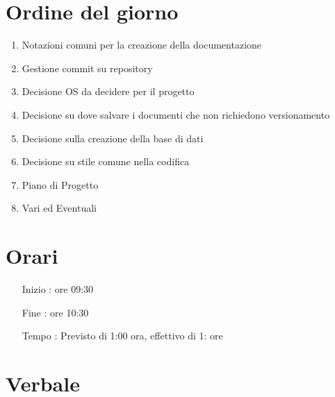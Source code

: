 \documentclass[11pt]{meetingmins}
\begin{document}
\maketitle

\section{Ordine del giorno}

\begin{enumerate}

\item Notazioni comuni per la creazione della documentazione
\item Gestione commit su repository
\item Decisione OS da decidere per il progetto
\item Decisione su dove salvare i documenti che non richiedono versionamento
\item Decisione sulla creazione della base di dati
\item Decisione su stile comune nella codifica
\item Piano di Progetto
  \item Vari ed Eventuali

\end{enumerate}

\section{Orari}

\begin{itemize}
\item[Inizio]: ore 09:30
\item[Fine]: ore 10:30
\item[Tempo]: Previsto di 1:00 ora, effettivo di 1: ore

\end{itemize}

\section{Verbale}
  

\end{document}
